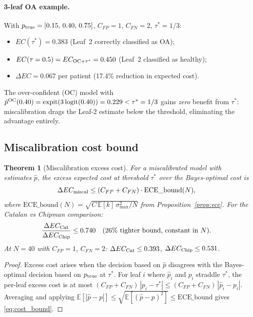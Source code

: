\documentclass[ba,preprint]{imsart}
\theoremstyle{plain}
\newtheorem{theorem}{Theorem}
\theoremstyle{remark}
\newcommand{\Eop}{\mathbb{E}}
\begin{document}
\paragraph{3-leaf OA example.}
With $p_{\rm true}=[0.15,\,0.40,\,0.75]$, $C_{FP}=1$, $C_{FN}=2$, $\tau^*=1/3$:
\begin{itemize}
  \item $EC(\tau^*)=0.383$ (Leaf~2 correctly classified as OA);
  \item $EC(\tau=0.5)=EC_{\rm OC+\tau^*}=0.450$ (Leaf~2 classified as healthy);
  \item $\Delta EC = 0.067$ per patient (17.4\% reduction in expected cost).
\end{itemize}
The over-confident (OC) model with $\hat{p}^{\rm OC}(0.40) = \mathrm{expit}(3\,\mathrm{logit}(0.40)) = 0.229 < \tau^* = 1/3$
gains \emph{zero} benefit from $\tau^*$: miscalibration drags the Leaf-2
estimate below the threshold, eliminating the advantage entirely.

\subsection{Miscalibration cost bound}

\begin{theorem}[Miscalibration excess cost]
\label{thm:cost_bound}
  For a miscalibrated model with estimates $\hat{p}$,
  the excess expected cost at threshold $\tau^*$ over the Bayes-optimal cost is
  \begin{equation}
    \Delta EC_{\rm miscal} \leq (C_{FP}+C_{FN}) \cdot \mathrm{ECE\_bound}(N),
    \label{eq:cost_bound}
  \end{equation}
  where $\mathrm{ECE\_bound}(N) = \sqrt{C\,\Eop[k]\,\sigma^2_{\max}/N}$
  from Proposition~\ref{prop:ece}.
  For the Catalan vs Chipman comparison:
  \begin{equation}
    \frac{\Delta EC_{\rm Cat}}{\Delta EC_{\rm Chip}} \leq 0.740
    \quad\text{(26\% tighter bound, constant in $N$)}.
  \end{equation}
  At $N=40$ with $C_{FP}=1$, $C_{FN}=2$:
  $\Delta EC_{\rm Cat} \leq 0.393$, $\Delta EC_{\rm Chip} \leq 0.531$.
\end{theorem}

\begin{proof}
  Excess cost arises when the decision based on $\hat{p}$ disagrees with the
  Bayes-optimal decision based on $p_{\rm true}$ at $\tau^*$.
  For leaf $i$ where $\hat{p}_i$ and $p_i$ straddle $\tau^*$,
  the per-leaf excess cost is at most $(C_{FP}+C_{FN})\,|p_i - \tau^*|
  \leq (C_{FP}+C_{FN})\,|\hat{p}_i - p_i|$.
  Averaging and applying $\Eop[|\hat{p}-p|] \leq \sqrt{\Eop[(\hat{p}-p)^2]}
  \leq \mathrm{ECE\_bound}$ gives \eqref{eq:cost_bound}.
\end{proof}
\end{document}
